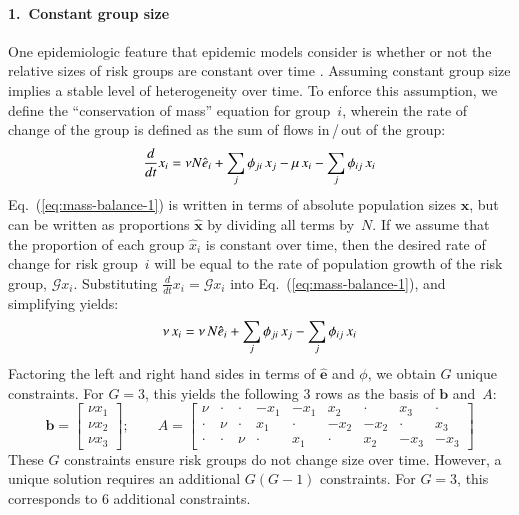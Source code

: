 \paragraph{1.~Constant group size}
\label{con:const-group}
One epidemiologic feature that epidemic models consider
is whether or not the relative sizes of risk groups are constant over time
\citep{Henry2015,Boily2015}.
Assuming constant group size implies a stable level of heterogeneity over time.
To enforce this assumption,
we define the ``conservation of mass'' equation for group~$i$,
wherein the rate of change of the group
is defined as the sum of flows in\,/\,out of the group:
\begin{equation}\label{eq:mass-balance-1}
\frac{d}{dt}x_i
= \nu N \hat{e}_i + \sum_{j}{\phi_{ji} \thinspace x_j}
- \mu \thinspace x_i - \sum_{j}{\phi_{ij} \thinspace x_i}
\end{equation}
Eq.~(\ref{eq:mass-balance-1}) is written in terms of
absolute population sizes $\bm{x}$,
but can be written as proportions $\bm{\hat{x}}$
by dividing all terms by~$N$.
If we assume that the proportion of each group $\hat{x}_i$ is constant over time,
then the desired rate of change for risk group~$i$
will be equal to the rate of population growth of the risk group, $\mathcal{G} x_i$.
Substituting $\frac{d}{dt}x_i = \mathcal{G} x_i$
into Eq.~(\ref{eq:mass-balance-1}),
and simplifying yields:
\begin{equation}\label{eq:mass-balance-2}
\nu \thinspace x_i
= \nu \thinspace N \hat{e}_i + \sum_{j}{\phi_{ji} \thinspace x_j}
- \sum_{j}{\phi_{ij} \thinspace x_i}
\end{equation}
Factoring the left and right hand sides in terms of $\bm{\hat{e}}$ and $\phi$,
we obtain $G$ unique constraints.
For $G = 3$, this yields the following 3 rows as the basis of $\bm{b}$ and~$A$:
\begin{equation}\label{eq:eg-basis}
\bm{b} = \left[\begin{array}{c}
\nu x_1 \\ \nu x_2 \\ \nu x_3
\end{array}\right];\qquad
A = \left[\begin{array}{ccccccccc}
   \nu  & \cdot & \cdot & -x_1  & -x_1  &  x_2  & \cdot &  x_3  & \cdot \\
  \cdot &  \nu  & \cdot &  x_1  & \cdot & -x_2  & -x_2  & \cdot &  x_3  \\
  \cdot & \cdot &  \nu  & \cdot &  x_1  & \cdot &  x_2  & -x_3  & -x_3
\end{array}\right] 
\end{equation}
These $G$ constraints ensure risk groups do not change size over time.
However, a unique solution requires
an additional $G(G-1)$ constraints.
For $G = 3$, this corresponds to 6 additional constraints.
